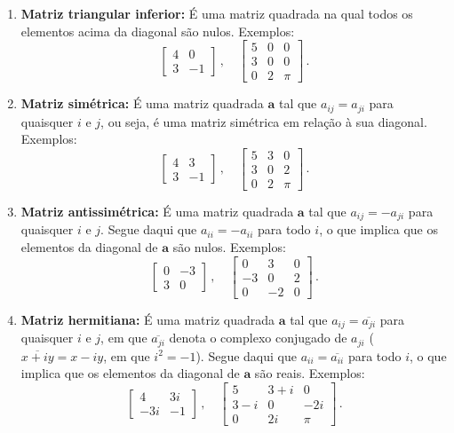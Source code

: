 \documentclass[12pt,a4paper]{report}
\newcommand{\mb}{\mathbf}
\begin{document}
\begin{enumerate}
  \item \textbf{Matriz triangular inferior:} É uma matriz quadrada na qual todos os elementos acima da diagonal são nulos. Exemplos:
  $$\begin{bmatrix}
    4&0\\
    3&-1
  \end{bmatrix}\,,\quad \begin{bmatrix}
    5&0&0\\
    3&0&0\\
    0&2&\pi
  \end{bmatrix}\,.$$
  \item \textbf{Matriz simétrica:} É uma matriz quadrada $\mb{a}$ tal que $a_{ij}=a_{ji}$ para quaisquer $i$ e $j$, ou seja, é uma matriz simétrica em relação à sua diagonal. Exemplos:
  $$\begin{bmatrix}
    4&3\\
    3&-1
  \end{bmatrix}\,,\quad \begin{bmatrix}
    5&3&0\\
    3&0&2\\
    0&2&\pi
  \end{bmatrix}\,.$$
  \item \textbf{Matriz antissimétrica:} É uma matriz quadrada $\mb{a}$ tal que $a_{ij}=-a_{ji}$ para quaisquer $i$ e $j$. Segue daqui que $a_{ii}=-a_{ii}$ para todo $i$, o que implica que os elementos da diagonal de $\mb a$ são nulos. Exemplos:
  $$\begin{bmatrix}
    0&-3\\
    3&0
  \end{bmatrix}\,,\quad \begin{bmatrix}
    0&3&0\\
    -3&0&2\\
    0&-2&0
  \end{bmatrix}\,.$$
  \item \textbf{Matriz hermitiana:} É uma matriz quadrada $\mb a$ tal que $a_{ij}=\overline{a_{ji}}$ para quaisquer $i$ e $j$, em que $\overline{a_{ji}}$ denota o complexo conjugado de $a_{ji}$ ($\overline{x+iy}=x-iy$, em que $i^2=-1$). Segue daqui que $a_{ii}=\overline{a_{ii}}$ para todo $i$, o que implica que os elementos da diagonal de $\mb a$ são reais. Exemplos:
  $$\begin{bmatrix}
    4&3i\\
    -3i&-1
  \end{bmatrix}\,,\quad \begin{bmatrix}
    5&3+i&0\\
    3-i&0&-2i\\
    0&2i&\pi
  \end{bmatrix}\,.$$
\end{enumerate}
\end{document}
